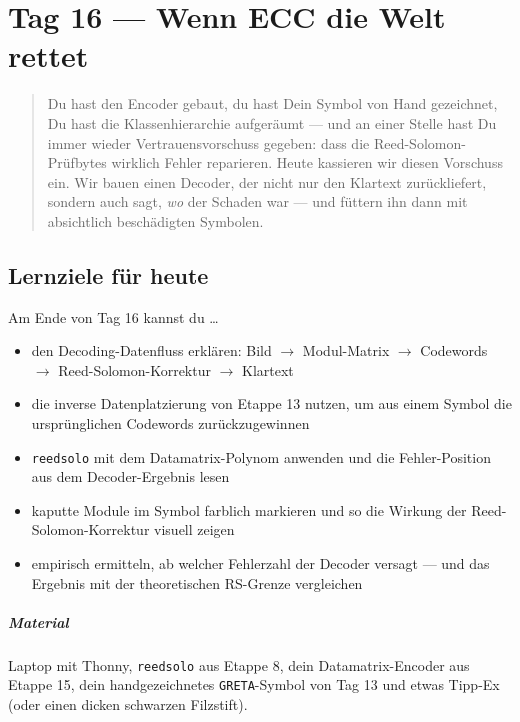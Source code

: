 \chapter{Tag 16 — Wenn ECC die Welt rettet}

\begin{quote}
Du hast den Encoder gebaut, du hast Dein Symbol von Hand gezeichnet,
Du hast die Klassenhierarchie aufgeräumt — und an einer Stelle hast
Du immer wieder Vertrauensvorschuss gegeben: dass die Reed-Solomon-
Prüfbytes wirklich Fehler reparieren. Heute kassieren wir diesen
Vorschuss ein. Wir bauen einen Decoder, der nicht nur den Klartext
zurückliefert, sondern auch sagt, \emph{wo} der Schaden war —
und füttern ihn dann mit absichtlich beschädigten Symbolen.
\end{quote}

\section*{Lernziele für heute}

Am Ende von Tag 16 kannst du \dots

\begin{itemize}
\item den Decoding-Datenfluss erklären: Bild $\to$ Modul-Matrix
  $\to$ Codewords $\to$ Reed-Solomon-Korrektur $\to$ Klartext
\item die inverse Datenplatzierung von Etappe 13 nutzen, um aus
  einem Symbol die ursprünglichen Codewords zurück­zugewinnen
\item \texttt{reedsolo} mit dem Datamatrix-Polynom anwenden und
  die Fehler-Position aus dem Decoder-Ergebnis lesen
\item kaputte Module im Symbol farblich markieren und so die
  Wirkung der Reed-Solomon-Korrektur visuell zeigen
\item empirisch ermitteln, ab welcher Fehlerzahl der Decoder
  versagt — und das Ergebnis mit der theoretischen RS-Grenze
  vergleichen
\end{itemize}

\paragraph{Material} Laptop mit Thonny, \texttt{reedsolo} aus
Etappe 8, dein Datamatrix-Encoder aus Etappe 15, dein hand­gezeichnetes
\texttt{GRETA}-Symbol von Tag 13 und etwas Tipp-Ex (oder einen dicken
schwarzen Filzstift).


